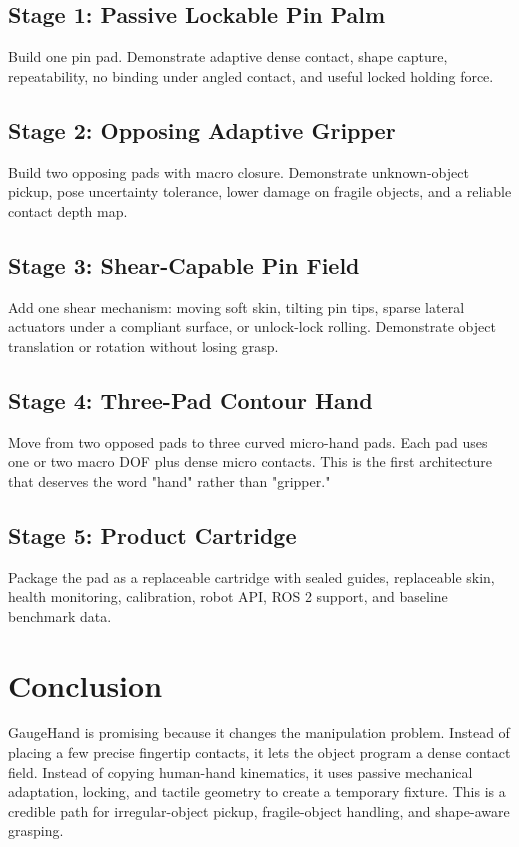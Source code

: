 \documentclass[11pt]{article}
\newcommand{\GaugeHand}{GaugeHand}
\begin{document}
\subsection{Stage 1: Passive Lockable Pin Palm}

Build one pin pad. Demonstrate adaptive dense contact, shape capture, repeatability, no binding under angled contact, and useful locked holding force.

\subsection{Stage 2: Opposing Adaptive Gripper}

Build two opposing pads with macro closure. Demonstrate unknown-object pickup, pose uncertainty tolerance, lower damage on fragile objects, and a reliable contact depth map.

\subsection{Stage 3: Shear-Capable Pin Field}

Add one shear mechanism: moving soft skin, tilting pin tips, sparse lateral actuators under a compliant surface, or unlock-lock rolling. Demonstrate object translation or rotation without losing grasp.

\subsection{Stage 4: Three-Pad Contour Hand}

Move from two opposed pads to three curved micro-hand pads. Each pad uses one or two macro DOF plus dense micro contacts. This is the first architecture that deserves the word "hand" rather than "gripper."

\subsection{Stage 5: Product Cartridge}

Package the pad as a replaceable cartridge with sealed guides, replaceable skin, health monitoring, calibration, robot API, ROS 2 support, and baseline benchmark data.

\section{Conclusion}

\GaugeHand{} is promising because it changes the manipulation problem. Instead of placing a few precise fingertip contacts, it lets the object program a dense contact field. Instead of copying human-hand kinematics, it uses passive mechanical adaptation, locking, and tactile geometry to create a temporary fixture. This is a credible path for irregular-object pickup, fragile-object handling, and shape-aware grasping.
\end{document}
